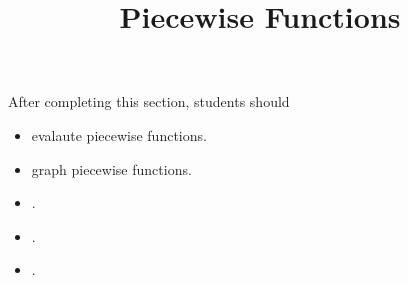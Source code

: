 \documentclass{ximera}
\title{Piecewise Functions}
\begin{document}
\begin{abstract}
\end{abstract}
\maketitle

\begin{sectionOutcomes}
After completing this section, students should 

\begin{itemize}
\item evalaute piecewise functions.
\item graph piecewise functions.
\item .
\item .
\item .
\end{itemize}
\end{sectionOutcomes}
\end{document}
